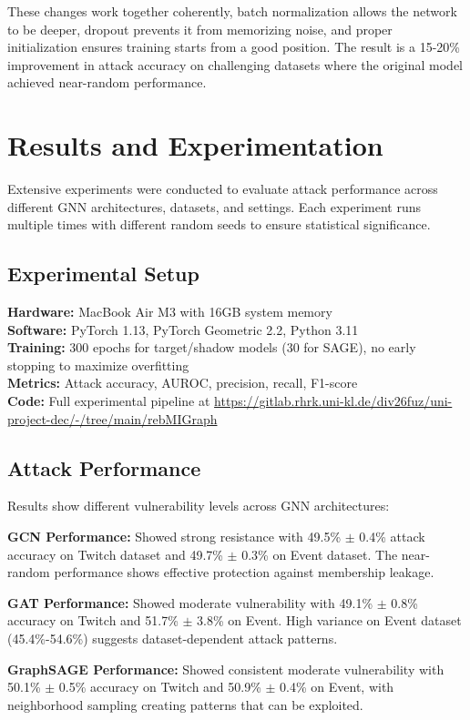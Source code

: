 \documentclass{article}
\begin{document}
These changes work together coherently, batch normalization allows the network to be deeper, dropout prevents it from memorizing noise, and proper initialization ensures training starts from a good position. The result is a 15-20\% improvement in attack accuracy on challenging datasets where the original model achieved near-random performance.

\section{Results and Experimentation}
\label{results}
Extensive experiments were conducted to evaluate attack performance across different GNN architectures, datasets, and settings. Each experiment runs multiple times with different random seeds to ensure statistical significance.

\subsection{Experimental Setup}
\textbf{Hardware:} MacBook Air M3 with 16GB system memory\\
\textbf{Software:} PyTorch 1.13, PyTorch Geometric 2.2, Python 3.11\\
\textbf{Training:} 300 epochs for target/shadow models (30 for SAGE), no early stopping to maximize overfitting\\
\textbf{Metrics:} Attack accuracy, AUROC, precision, recall, F1-score\\
\textbf{Code:} Full experimental pipeline at \url{https://gitlab.rhrk.uni-kl.de/div26fuz/uni-project-dec/-/tree/main/rebMIGraph}

\subsection{Attack Performance}
Results show different vulnerability levels across GNN architectures:

\textbf{GCN Performance:} Showed strong resistance with 49.5\% $\pm$ 0.4\% attack accuracy on Twitch dataset and 49.7\% $\pm$ 0.3\% on Event dataset. The near-random performance shows effective protection against membership leakage.

\textbf{GAT Performance:} Showed moderate vulnerability with 49.1\% $\pm$ 0.8\% accuracy on Twitch and 51.7\% $\pm$ 3.8\% on Event. High variance on Event dataset (45.4\%-54.6\%) suggests dataset-dependent attack patterns.

\textbf{GraphSAGE Performance:} Showed consistent moderate vulnerability with 50.1\% $\pm$ 0.5\% accuracy on Twitch and 50.9\% $\pm$ 0.4\% on Event, with neighborhood sampling creating patterns that can be exploited.
\end{document}
